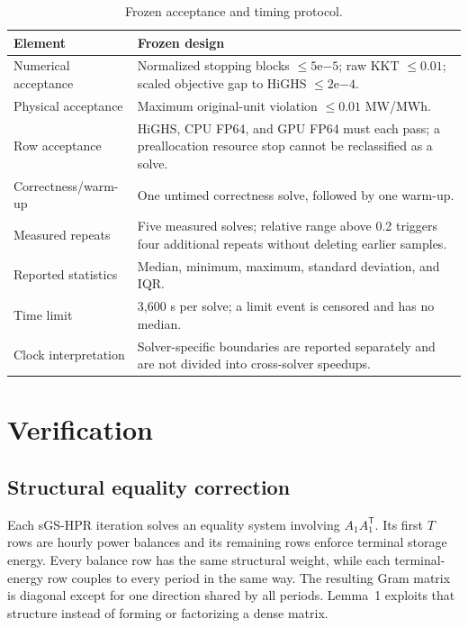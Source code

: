 \documentclass[10pt,journal]{IEEEtran}
\newcommand{\sgshpr}{sGS-HPR}
\begin{document}
\begin{table}[t]
\caption{Frozen acceptance and timing protocol.}
\label{tab:protocol}
\centering
\scriptsize
\renewcommand{\arraystretch}{0.95}
\begin{tabular}{@{}p{}p{}@{}}
\toprule
Element & Frozen design \\
\midrule
Numerical acceptance & Normalized stopping blocks $\le5\mathrm{e}{-5}$;
raw KKT $\le0.01$; scaled objective gap to HiGHS $\le2\mathrm{e}{-4}$. \\
Physical acceptance & Maximum original-unit violation $\le0.01$ MW/MWh. \\
Row acceptance & HiGHS, CPU FP64, and GPU FP64 must each pass; a preallocation
resource stop cannot be reclassified as a solve. \\
Correctness/warm-up & One untimed correctness solve, followed by one warm-up. \\
Measured repeats & Five measured solves; relative range above 0.2 triggers four
additional repeats without deleting earlier samples. \\
Reported statistics & Median, minimum, maximum, standard deviation, and IQR. \\
Time limit & 3,600 s per solve; a limit event is censored and has no median. \\
Clock interpretation & Solver-specific boundaries are reported separately and
are not divided into cross-solver speedups. \\
\bottomrule
\end{tabular}
\end{table}

\section{Verification}

\subsection{Structural equality correction}

Each \sgshpr{} iteration solves an equality system involving
$A_1A_1^{\mathsf T}$. Its first $T$ rows are hourly power balances and its
remaining rows enforce terminal storage energy. Every balance row has the same
structural weight, while each terminal-energy row couples to every period in
the same way. The resulting Gram matrix is diagonal except for one direction
shared by all periods. Lemma~1 exploits that structure instead of forming or
factorizing a dense matrix.
\end{document}
